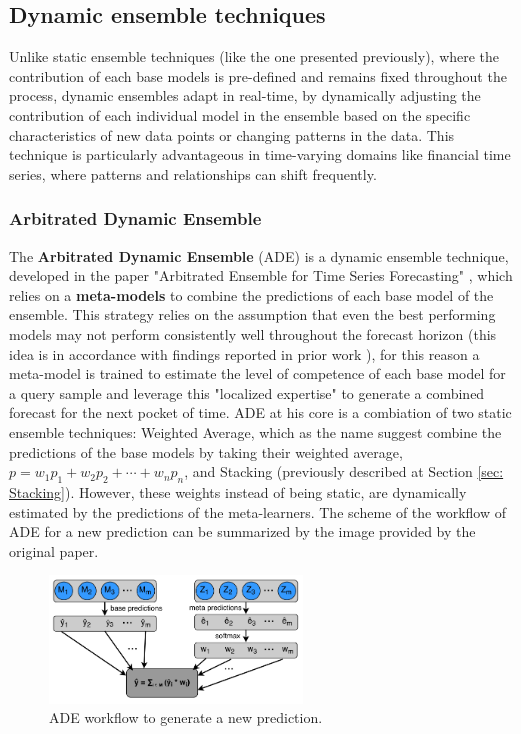 \subsection{Dynamic ensemble techniques}
Unlike static ensemble techniques (like the one presented previously), where the contribution of each base models is pre-defined and remains fixed throughout the process, dynamic ensembles adapt in real-time, by dynamically adjusting the contribution of each individual model in the ensemble based on the specific characteristics of new data points or changing patterns in the data. This technique is particularly advantageous in time-varying domains like financial time series, where patterns and relationships can shift frequently. 

\subsubsection{Arbitrated Dynamic Ensemble}
The \textbf{Arbitrated Dynamic Ensemble} (ADE) is a dynamic ensemble technique, developed in the paper "Arbitrated Ensemble for Time Series Forecasting" \cite{cerqueira2017arbitrated}, which relies on a \textbf{meta-models} to combine the predictions of each base model of the ensemble. This strategy relies on the assumption that even the best performing models may not perform consistently well throughout the forecast horizon (this idea is in accordance with findings reported in prior
work \cite{aiolfi2006persistence}), for this reason a meta-model is trained to estimate the level of competence of each base model for a query sample and leverage this "localized expertise" to generate a combined forecast for the next pocket of time. ADE at his core is a combiation of two static ensemble techniques: Weighted Average, which as the name suggest combine the predictions of the base models by taking their weighted average, $p = w_1 p_1 + w_2 p_2 + \cdots + w_n p_n$,  and Stacking (previously described at Section \ref{sec: Stacking}). However, these weights instead of being static, are dynamically estimated by the predictions of the meta-learners. The scheme of the workflow of ADE for a new prediction can be summarized by the image provided by the original paper.
\begin{figure}[H] 
    \centering
    \includegraphics[width=0.6\textwidth]{Machine_learning_thesis/Images/ADE schema.png}
    \caption{ADE workflow to generate a new prediction.} 
    \label{fig:ADE} 
\end{figure}
